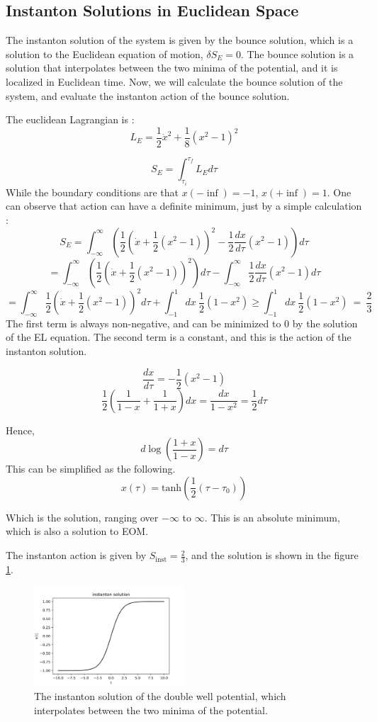 \documentclass{article}
\begin{document}
\subsection{Instanton Solutions in Euclidean Space}


The instanton solution of the system is given by the bounce solution, which is a solution to the Euclidean equation of motion, $\delta S_E = 0$.
The bounce solution is a solution that interpolates between the two minima of the potential, and it is localized in Euclidean time.
Now, we will calculate the bounce solution of the system, and evaluate the instanton action of the bounce solution.

The euclidean Lagrangian is :
\[
    L_E = \frac{1}{2}\dot{x}^2 + \frac{1}{8}(x^2-1)^2
\]

\[
    S_E = \int_{\tau_i}^{\tau_f} L_E d\tau
\]
While the boundary conditions are that $x(-\inf)=-1$, $x(+\inf)=1$. One can observe that action can have a definite minimum, just by a simple calculation :
\[
    S_E = \int_{-\infty}^{\infty} \left(\frac{1}{2} (\dot{x}+\frac{1}{2}(x^2-1))^2 - \frac{1}{2}\frac{dx}{d\tau}(x^2-1) \right)d\tau
\]
\[
    =\int_{-\infty}^{\infty} \left(\frac{1}{2} (\dot{x}+\frac{1}{2}(x^2-1))^2 \right)d\tau - \int_{-\infty}^{\infty}   \frac{1}{2}\frac{dx}{d\tau}(x^2-1) d\tau
\]
\[
    =\int_{-\infty}^{\infty} \frac{1}{2} \left(\dot{x}+\frac{1}{2}(x^2-1)\right)^2 d\tau + \int_{-1}^{1}    dx \  \frac{1}{2}(1-x^2) \geq \int_{-1}^{1}    dx \  \frac{1}{2}(1-x^2) \ = \ \frac{2}{3}
\]
The first term is always non-negative, and can be minimized to 0 by the solution of the EL equation. 
The second term is a constant, and this is the action of the instanton solution.


\[
    \frac{dx}{d\tau} = -\frac{1}{2}(x^2-1)
\]
\[
    \frac{1}{2} (\frac{1}{1-x}+\frac{1}{1+x})dx =\frac{dx}{1-x^2} = \frac{1}{2}d\tau
\]

Hence,
\[
    d\log(\frac{1+x}{1-x}) = d\tau
\]
This can be simplified as the following.
\[
    x(\tau) = \mathrm{tanh}(\frac{1}{2}(\tau-\tau_0))
\]

Which is the solution, ranging over $-\infty$ to $\infty$. This is an absolute minimum, which is also a solution to EOM.

The instanton action is given by $S_{\text{inst}} = \frac{2}{3}$, and the solution is shown in the figure \ref{fig:instanton}.

\begin{figure}
    \centering
    \includegraphics[width=0.5\textwidth]{instanton.png}
    \caption{The instanton solution of the double well potential, which interpolates between the two minima of the potential.}
    \label{fig:instanton}
\end{figure}
\end{document}
